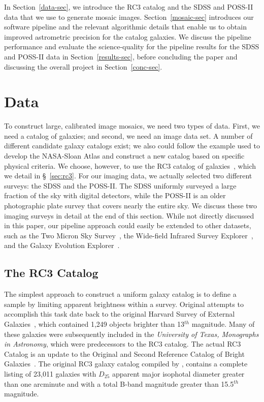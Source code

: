 \documentclass[authoryear, 12pt, 5p, times]{elsarticle}
\begin{document}
In Section~\ref{data-sec}, we introduce the RC3 catalog and the SDSS and POSS-II data that we use to generate mosaic images. Section~\ref{mosaic-sec} introduces our software pipeline and the relevant algorithmic details that enable us to obtain improved astrometric precision for the catalog galaxies. We discuss the pipeline performance and evaluate the science-quality for the pipeline results for the SDSS and POSS-II data in Section~\ref{results-sec}, before concluding the paper and discussing the overall project in Section~\ref{conc-sec}. 

\section{Data\label{data-sec}}

To construct large, calibrated image mosaics, we need two types of data. First, we need a catalog of galaxies; and second, we need an image data set. A number of different candidate galaxy catalogs exist; we also could follow the example used to develop the NASA-Sloan Atlas and construct a new catalog based on specific physical criteria. We choose, however, to use the RC3 catalog of galaxies~\citep{rc3}, which we detail in \S~\ref{sec:rc3}. For our imaging data, we actually selected two different surveys: the SDSS and the POSS-II. The SDSS uniformly surveyed a large fraction of the sky with digital detectors, while the POSS-II is an older photographic plate survey that covers nearly the entire sky. We discuss these two imaging surveys in detail at the end of this section. While not directly discussed in this paper, our pipeline approach could easily be extended to other datasets, such as the Two Micron Sky Survey~\citep{2mass}, the Wide-field Infrared Survey Explorer~\citep{wise}, and the Galaxy Evolution Explorer~\citep{galex}.

\subsection{The RC3 Catalog\label{sec:rc3}}

The simplest approach to construct a uniform galaxy catalog is to  define a sample by limiting apparent brightness within a survey. Original attempts to accomplish this task date back to the original Harvard Survey of External Galaxies~\citep{shapley-ames}, which contained 1,249 objects brighter than 13$^{th}$ magnitude. Many of these galaxies were subsequently included in the \textit{University of Texas, Monographs in Astronomy}, which were predecessors to the RC3 catalog. The actual RC3 Catalog is an update to the Original and Second Reference Catalog of Bright Galaxies~\citep{rc2}. The original RC3 galaxy catalog compiled by \citet{rc3}, contains a  complete listing of 23,011 galaxies with $D_{25}$ apparent major isophotal diameter greater than one arcminute and with a total B-band magnitude greater than 15.5$^{th}$ magnitude. 
\end{document}
